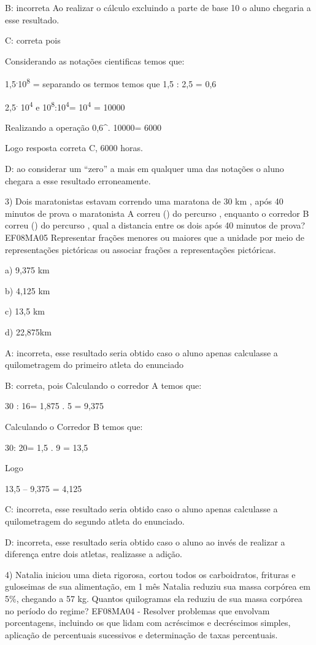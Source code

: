 B: incorreta Ao realizar o cálculo excluindo a parte de base 10 o aluno
chegaria a esse resultado.

C: correta pois

Considerando as notações cientificas temos que:

1,5\textsuperscript{.}10\textsuperscript{8} = separando os termos temos
que 1,5 : 2,5 = 0,6

2,5\textsuperscript{.} 10\textsuperscript{4} e
10\textsuperscript{8}:10\textsuperscript{4}= 10\textsuperscript{4} =
10000

Realizando a operação 0,6^{.} 10000= 6000

Logo resposta correta C, 6000 horas.

D: ao considerar um ``zero'' a mais em qualquer uma das notações o aluno
chegara a esse resultado erroneamente.

3) Dois maratonistas estavam correndo uma maratona de 30 km , após 40
minutos de prova o maratonista A correu () do percurso ,
enquanto o corredor B correu () do percurso , qual a
distancia entre os dois após 40 minutos de prova? EF08MA05 Representar
frações menores ou maiores que a unidade por meio de representações
pictóricas ou associar frações a representações pictóricas.

a) 9,375 km

b) 4,125 km

c) 13,5 km

d) 22,875km

A: incorreta, esse resultado seria obtido caso o aluno apenas calculasse
a quilometragem do primeiro atleta do enunciado

B: correta, pois Calculando o corredor A temos que:

30 : 16= 1,875 . 5 = 9,375

Calculando o Corredor B temos que:

30: 20= 1,5 . 9 = 13,5

Logo

13,5 -- 9,375 = 4,125

C: incorreta, esse resultado seria obtido caso o aluno apenas calculasse
a quilometragem do segundo atleta do enunciado.

D: incorreta, esse resultado seria obtido caso o aluno ao invés de
realizar a diferença entre dois atletas, realizasse a adição.

4) Natalia iniciou uma dieta rigorosa, cortou todos os carboidratos,
frituras e guloseimas de sua alimentação, em 1 mês Natalia reduziu sua
massa corpórea em 5\%, chegando a 57 kg. Quantos quilogramas ela reduziu
de sua massa corpórea no período do regime? EF08MA04 - Resolver
problemas que envolvam porcentagens, incluindo os que lidam com
acréscimos e decréscimos simples, aplicação de percentuais sucessivos e
determinação de taxas percentuais.

